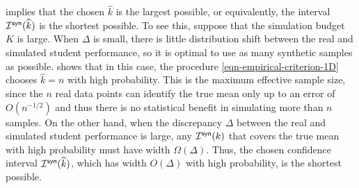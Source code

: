  implies that the chosen $\widehat{k}$ is the largest possible, or equivalently, the interval $\mathcal{I}^{\mathsf{syn}}(\widehat{k})$ is the shortest possible. To see this, suppose that the simulation budget $K$ is large. When $\Delta$ is small, there is little distribution shift between the real and simulated student performance, so it is optimal to use as many synthetic samples as possible.  shows that in this case, the procedure \eqref{eqn-empirical-criterion-1D} chooses $\widehat{k}=n$ with high probability. This is the maximum effective sample size, since the $n$ real data points can identify the true mean only up to an error of $O(n^{-1/2})$ and thus there is no statistical benefit in simulating more than $n$ samples. On the other hand, when the discrepancy $\Delta$ between the real and simulated student performance is large, any $\mathcal{I}^{\mathsf{syn}}(k)$ that covers the true mean with high probability must have width $\Omega(\Delta)$. Thus, the chosen confidence interval $\mathcal{I}^{\mathsf{syn}}(\widehat{k})$, which has width $O(\Delta)$ with high probability, is the shortest possible.

